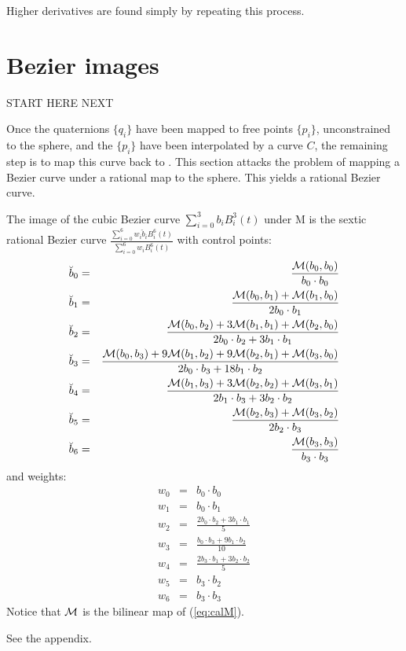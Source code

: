 \documentclass[11pt]{article}
\begin{document}
Higher derivatives are found simply by repeating this process.

\clearpage

\section{Bezier images}

START HERE NEXT

Once the quaternions $\{q_i\}$ have been mapped to free points $\{p_i\}$, 
unconstrained to the sphere,
and the $\{p_i\}$ have been interpolated by a curve $C$,
the remaining step is to map this curve back to .
This section attacks the problem of mapping a Bezier curve under a rational map
to the sphere.
This yields a rational Bezier curve.

\begin{theorem}
\label{thm:imagecurve}
The image of the cubic Bezier curve $\sum_{i=0}^3 b_i B_i^3(t)$ under M 
is the sextic rational Bezier curve $\frac{\sum_{i=0}^6 w_i \breve{b}_i B_i^6(t)}
                                          {\sum_{i=0}^6 w_i B_i^6(t)}$ 
with control points:
\begin{eqnarray}
\breve{b}_0 & = & \frac{{\cal M}(b_0,b_0)}{b_0 \cdot b_0} \nonumber \\
\breve{b}_1 & = & \frac{{\cal M}(b_0,b_1) + {\cal M}(b_1,b_0)}{2b_0\cdot b_1} \nonumber \\
\breve{b}_2 & = & \frac{{\cal M}(b_0,b_2) + 3{\cal M}(b_1,b_1) + {\cal M}(b_2,b_0)}{2b_0 \cdot b_2 + 3b_1 \cdot b_1} \nonumber \\
\breve{b}_3 & = & \frac{{\cal M}(b_0,b_3) + 9{\cal M}(b_1,b_2) + 9{\cal M}(b_2,b_1) + {\cal M}(b_3,b_0)}{2b_0 \cdot b_3 + 18 b_1 \cdot b_2} \nonumber \\
\breve{b}_4 & = & \frac{{\cal M}(b_1,b_3) + 3{\cal M}(b_2,b_2) + {\cal M}(b_3,b_1)}{2b_1 \cdot b_3 + 3 b_2 \cdot b_2} \nonumber \\
\breve{b}_5 & = & \frac{{\cal M}(b_2,b_3) + {\cal M}(b_3,b_2)}{2b_2 \cdot b_3} \nonumber \\
\breve{b}_6 & = & \frac{{\cal M}(b_3,b_3)}{b_3 \cdot b_3} \nonumber
\end{eqnarray}
and weights:
\begin{eqnarray}
w_0 & = & b_0 \cdot b_0 \nonumber \\
w_1 & = & b_0 \cdot b_1 \nonumber \\
w_2 & = & \frac{2b_0 \cdot b_2 + 3b_1 \cdot b_1}{5} \nonumber \\
w_3 & = & \frac{b_0 \cdot b_3 + 9b_1 \cdot b_2}{10} \nonumber \\
w_4 & = & \frac{2b_3 \cdot b_1 + 3b_2 \cdot b_2}{5} \nonumber \\
w_5 & = & b_3 \cdot b_2 \nonumber \\
w_6 & = & b_3 \cdot b_3 \nonumber
\end{eqnarray}
Notice that ${\cal M}$ is the bilinear map of (\ref{eq:calM}).
\end{theorem}
\prf See the appendix.
\QED
\end{document}

